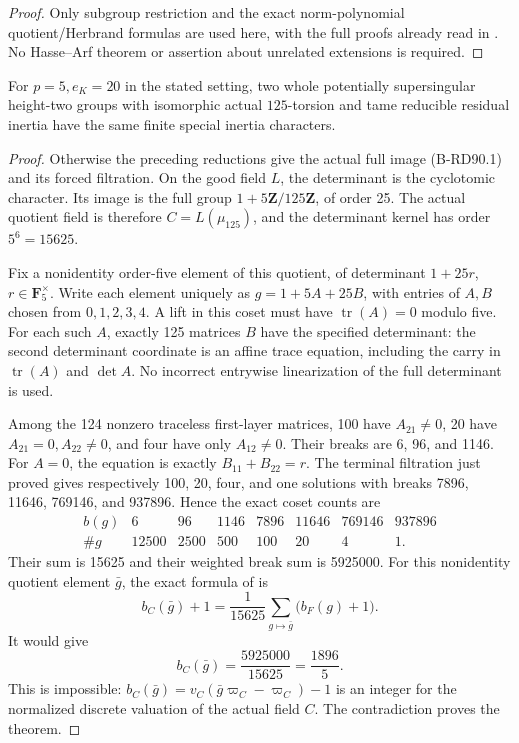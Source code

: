 \begin{proof}
Only subgroup restriction and the exact norm-polynomial
quotient/Herbrand formulas are used here, with the full proofs
already read in \cite[Proposition 3.7, Theorem 3.10 and Proposition 3.13(ii), full proofs, pp.~14--16]
{ColmezCorpsLocaux}. No Hasse--Arf theorem or assertion about
unrelated extensions is required.
\end{proof}

\begin{theorem}
\label{thm:B-RD90-tame-exclusion}
For \(p=5,e_K=20\) in the stated setting, two whole potentially
supersingular height-two groups with isomorphic actual
\(125\)-torsion and tame reducible residual inertia have the
same finite special inertia characters.
\end{theorem}
\begin{proof}
Otherwise the preceding reductions give the actual full image
(B-RD90.1) and its forced filtration. On the good field \(L\),
the determinant is the cyclotomic character. Its image is the
full group \(1+5\mathbf Z/125\mathbf Z\), of order 25.
The actual quotient field is therefore \(C=L(\mu_{125})\),
and the determinant kernel has order \(5^6=15625\).

Fix a nonidentity order-five element of this quotient, of
determinant \(1+25r\), \(r\in\mathbf F_5^\times\).
Write each element uniquely as \(g=1+5A+25B\), with entries
of \(A,B\) chosen from \(0,1,2,3,4\). A lift in this coset
must have \(\operatorname{tr}(A)=0\) modulo five. For each
such \(A\), exactly 125 matrices \(B\) have the specified
determinant: the second determinant coordinate is an affine
trace equation, including the carry in \(\operatorname{tr}(A)\)
and \(\det A\). No incorrect entrywise linearization of
the full determinant is used.

Among the 124 nonzero traceless first-layer matrices,
100 have \(A_{21}\ne0\), 20 have \(A_{21}=0,A_{22}\ne0\),
and four have only \(A_{12}\ne0\). Their breaks are
6, 96, and 1146. For \(A=0\), the equation is exactly
\(B_{11}+B_{22}=r\). The terminal filtration just proved
gives respectively 100, 20, four, and one solutions with
breaks 7896, 11646, 769146, and 937896. Hence the exact
coset counts are
\[
\begin{array}{c|rrrrrrr}
 b(g)&6&96&1146&7896&11646&769146&937896\\\hline
 \#g&12500&2500&500&100&20&4&1.
\end{array}                                                   \tag{B-RD90.14}
\]
Their sum is 15625 and their weighted break sum is 5925000.
For this nonidentity quotient element \(\bar g\), the exact
formula of \cite[Proposition 3.7 and full proof]{ColmezCorpsLocaux}
is
\[
 b_C(\bar g)+1
   =\frac{1}{15625}\sum_{g\mapsto\bar g}\bigl(b_F(g)+1\bigr).
\]
It would give
\[
                  b_C(\bar g)=\frac{5925000}{15625}
                              =\frac{1896}{5}.        \tag{B-RD90.15}
\]
This is impossible: \(b_C(\bar g)=v_C(\bar g\varpi_C-\varpi_C)-1\)
is an integer for the normalized discrete valuation of the
actual field \(C\). The contradiction proves the theorem.
\end{proof}

